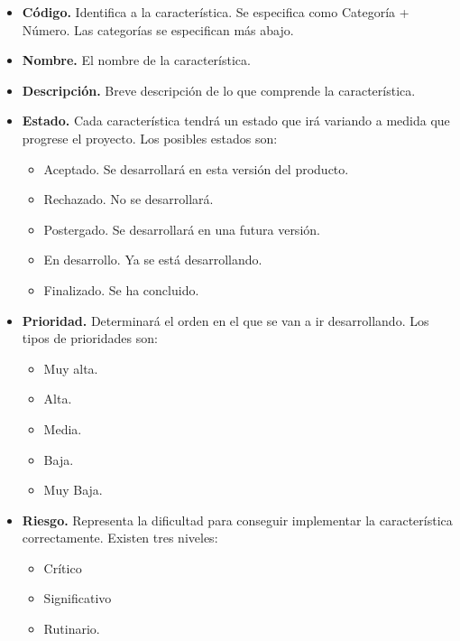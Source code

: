 	\begin{itemize}
	\item \textbf{Código.} Identifica a la característica. Se especifica como Categoría + Número. Las categorías se especifican más abajo.
	\item \textbf{Nombre.} El nombre de la característica.
	\item \textbf{Descripción.} Breve descripción de lo que comprende la característica.
	\item \textbf{Estado.} Cada característica tendrá un estado que irá variando a medida que progrese el proyecto. Los posibles estados son:
		\begin{itemize}
			\item Aceptado. Se desarrollará en esta versión del producto.
			\item Rechazado. No se desarrollará.
			\item Postergado. Se desarrollará en una futura versión.
			\item En desarrollo. Ya se está desarrollando.
			\item Finalizado. Se ha concluido.
		\end{itemize}
	\item \textbf{Prioridad.} Determinará el orden en el que se van a ir desarrollando. Los tipos de prioridades son:
		\begin{itemize}
			\item Muy alta.
			\item Alta.
			\item Media.
			\item Baja.
			\item Muy Baja.
		\end{itemize}
	\item \textbf{Riesgo.} Representa la dificultad para conseguir implementar la característica correctamente. Existen tres niveles: 
		\begin{itemize}
			\item Crítico
			\item Significativo
			\item Rutinario.
		\end{itemize}
	\end{itemize}

